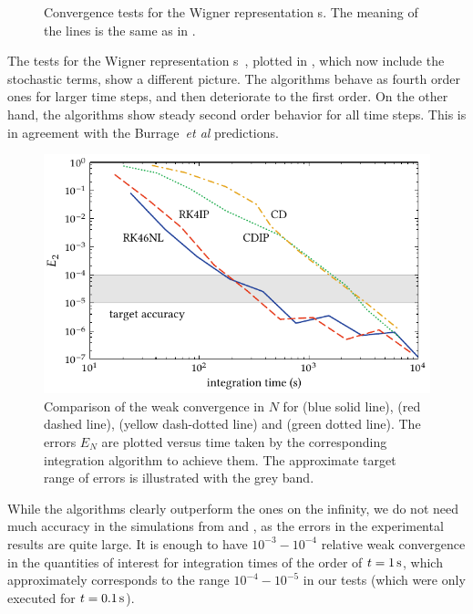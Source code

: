 \begin{figure}
    \caption[Convergence tests, s]{
    Convergence tests for the Wigner representation s.
    The meaning of the lines is the same as in .
    }%

    \label{fig:numerical:convergence-wigner}
\end{figure}

The tests for the Wigner representation s~, plotted in , which now include the stochastic terms, show a different picture.
The  algorithms behave as fourth order ones for larger time steps, and then deteriorate to the first order.
On the other hand, the  algorithms show steady second order behavior for all time steps.
This is in agreement with the Burrage~\textit{et al} predictions.

\begin{figure}
    \centerline{%
    \includegraphics{figures_generated/test/convergence_by_time.pdf}}%

    \caption[Comparison of integration algorithms]{
    Comparison of the weak convergence in $N$ for  (blue solid line),  (red dashed line),  (yellow dash-dotted line) and  (green dotted line).
    The errors $E_N$ are plotted versus time taken by the corresponding integration algorithm to achieve them.
    The approximate target range of errors is illustrated with the grey band.
    }%

    \label{fig:numerical:convergence-by-time}
\end{figure}

While the  algorithms clearly outperform the  ones on the infinity, we do not need much accuracy in the simulations from  and , as the errors in the experimental results are quite large.
It is enough to have $10^{-3}-10^{-4}$ relative weak convergence in the quantities of interest for integration times of the order of $t=1\mbox{\ensuremath{\,\mathrm{s}}}$, which approximately corresponds to the range $10^{-4}-10^{-5}$ in our tests (which were only executed for $t=0.1\mbox{\ensuremath{\,\mathrm{s}}}$).

